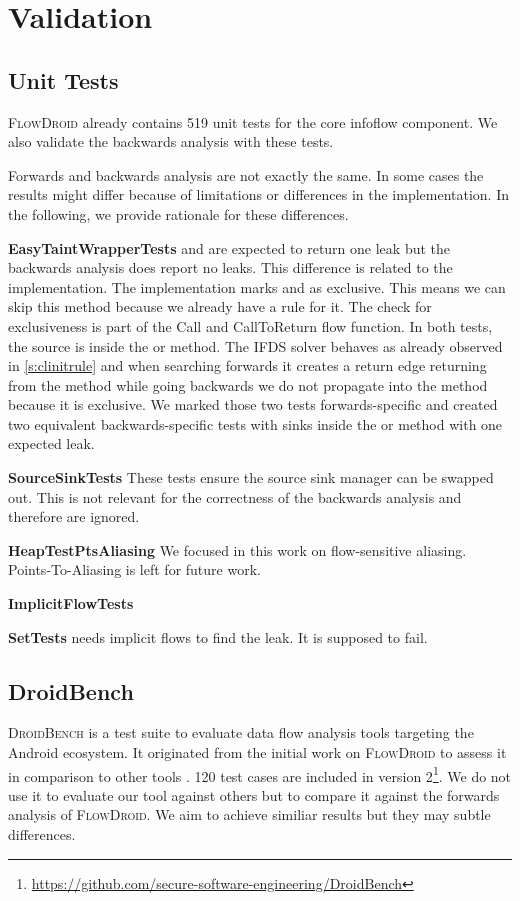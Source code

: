 \documentclass[../draft.tex]{subfiles}
\begin{document}
    \chapter{Validation}
    \section{Unit Tests}
    \textsc{FlowDroid} already contains 519 unit tests for the core infoflow component. We also validate the backwards analysis with these tests.

    Forwards and backwards analysis are not exactly the same. In some cases the results might differ because of limitations or differences in the implementation. In the following, we provide rationale for these differences.

    \textbf{EasyTaintWrapperTests}  and  are expected to return one leak but the backwards analysis does report no leaks. This difference is related to the  implementation. The implementation marks  and  as exclusive. This means we can skip this method because we already have a rule for it. The check for exclusiveness is part of the Call and CallToReturn flow function. In both tests, the source is inside the  or  method. The IFDS solver behaves as already observed in \autoref{s:clinitrule} and when searching forwards it creates a return edge returning from the method while going backwards we do not propagate into the method because it is exclusive.
    We marked those two tests forwards-specific and created two equivalent backwards-specific tests with sinks inside the  or  method with one expected leak.
    
    \textbf{SourceSinkTests} These tests ensure the source sink manager can be swapped out. This is not relevant for the correctness of the backwards analysis and therefore are ignored.

    \textbf{HeapTestPtsAliasing} We focused in this work on flow-sensitive aliasing. Points-To-Aliasing is left for future work.
    
    \textbf{ImplicitFlowTests} 

    \textbf{SetTests}  needs implicit flows to find the leak. It is supposed to fail.

    \section{DroidBench}
    \textsc{DroidBench} is a test suite to evaluate data flow analysis tools targeting the Android ecosystem. It originated from the initial work on \textsc{FlowDroid} to assess it in comparison to other tools \cite{Arzt2014}. 120 test cases are included in version 2\footnote{\url{https://github.com/secure-software-engineering/DroidBench}}.
    We do not use it to evaluate our tool against others but to compare it against the forwards analysis of \textsc{FlowDroid}. We aim to achieve similiar results but they may subtle differences.
    
\end{document}
